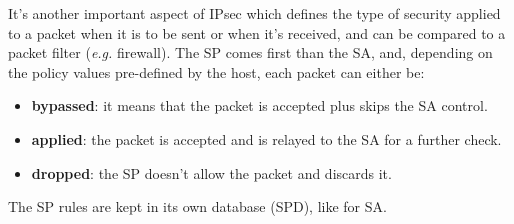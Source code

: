 \documentclass[oneside]{academica}
\begin{document}
It's another important aspect of IPsec which defines the type of security applied to a packet when it is to be sent or when it's received, and can be compared to a packet filter (\textit{e.g.} firewall).
The SP comes first than the SA, and, depending on the policy values pre-defined by the host, each packet can either be:
\begin{itemize}
  \item \textbf{bypassed}: it means that the packet is accepted plus skips the SA control.
  \item \textbf{applied}: the packet is accepted and is relayed to the SA for a further check.
  \item \textbf{dropped}: the SP doesn't allow the packet and discards it.
\end{itemize}
The SP rules are kept in its own database (SPD), like for SA.
\end{document}
